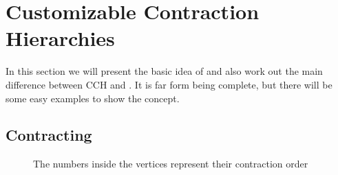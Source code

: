 \chapter{Customizable Contraction Hierarchies}\label{sec:Preliminary_CCH}

In this section we will present the basic idea of \cite[Customization Contraction Hierarchies]{CCH} and also work out the main difference between CCH and \cite[Contraction Hierarchies]{Geisberger_2012}.
It is far form being complete, but there will be some easy examples to show the concept. 

\section{Contracting}



\begin{figure}
    \centering
    
    \caption{The numbers inside the vertices represent their contraction order}
    \label{fig:contrating_and_searching}
\end{figure}

